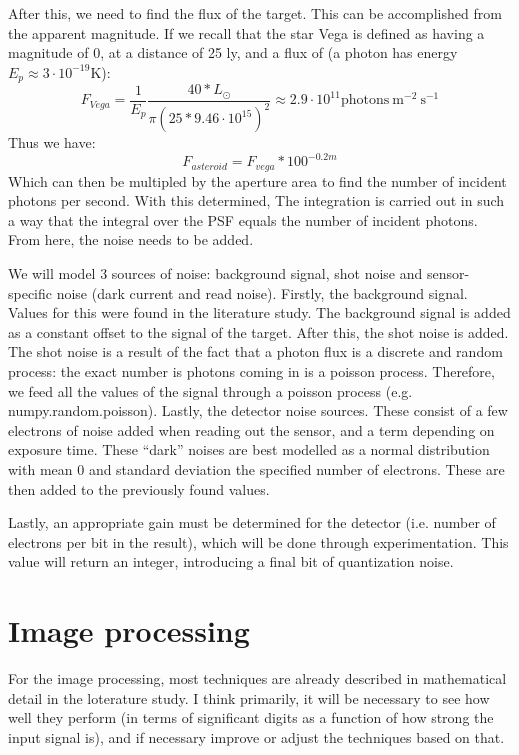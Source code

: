 \documentclass[a4paper,10pt]{article}
\begin{document}
After this, we need to find the flux of the target. This can be accomplished from the apparent magnitude. If we recall that the star Vega is defined as having a magnitude of 0, at a distance of 25 ly, and a flux of (a photon has energy $E_p \approx 3\cdot 10^{-19}$K):
\begin{equation}
 F_{Vega} = \frac{1}{E_p}\frac{40 * L_\odot}{\pi \left(25 * 9.46 \cdot 10^{15}\right)^2} \approx 2.9 \cdot 10^{11} \mathrm{photons}~\mathrm{m}^{-2}~\mathrm{s}^{-1}
\end{equation}
Thus we have:
\begin{equation}
 F_{asteroid} = F_{vega} * 100^{-0.2m}
\end{equation}
Which can then be multipled by the aperture area to find the number of incident photons per second. With this determined, The integration is carried out in such a way that the integral over the PSF equals the number of incident photons. From here, the noise needs to be added.

We will model 3 sources of noise: background signal, shot noise and sensor-specific noise (dark current and read noise). Firstly, the background signal. Values for this were found in the literature study. The background signal is added as a constant offset to the signal of the target. After this, the shot noise is added. The shot noise is a result of the fact that a photon flux is a discrete and random process: the exact number is photons coming in is a poisson process. Therefore, we feed all the values of the signal through a poisson process (e.g. numpy.random.poisson). Lastly, the detector noise sources. These consist of a few electrons of noise added when reading out the sensor, and a term depending on exposure time. These ``dark'' noises are best modelled as a normal distribution with mean 0 and standard deviation the specified number of electrons. These are then added to the previously found values.

Lastly, an appropriate gain must be determined for the detector (i.e. number of electrons per bit in the result), which will be done through experimentation. This value will return an integer, introducing a final bit of quantization noise.

\section{Image processing}

For the image processing, most techniques are already described in mathematical detail in the loterature study. I think primarily, it will be necessary to see how well they perform (in terms of significant digits as a function of how strong the input signal is), and if necessary improve or adjust the techniques based on that. \\
\end{document}
